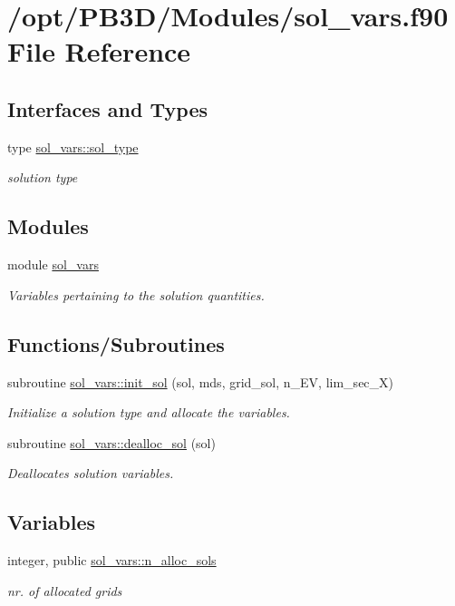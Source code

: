 \hypertarget{sol__vars_8f90}{}\section{/opt/\+P\+B3\+D/\+Modules/sol\+\_\+vars.f90 File Reference}
\label{sol__vars_8f90}
\subsection*{Interfaces and Types}
\begin{DoxyCompactItemize}
\item 
type \hyperlink{structsol__vars_1_1sol__type}{sol\+\_\+vars\+::sol\+\_\+type}
\begin{DoxyCompactList}\small\item\em solution type \end{DoxyCompactList}\end{DoxyCompactItemize}
\subsection*{Modules}
\begin{DoxyCompactItemize}
\item 
module \hyperlink{namespacesol__vars}{sol\+\_\+vars}
\begin{DoxyCompactList}\small\item\em Variables pertaining to the solution quantities. \end{DoxyCompactList}\end{DoxyCompactItemize}
\subsection*{Functions/\+Subroutines}
\begin{DoxyCompactItemize}
\item 
subroutine \hyperlink{namespacesol__vars_a05d1378774a44f53c9643bdacc5bee4a}{sol\+\_\+vars\+::init\+\_\+sol} (sol, mds, grid\+\_\+sol, n\+\_\+\+EV, lim\+\_\+sec\+\_\+X)
\begin{DoxyCompactList}\small\item\em Initialize a solution type and allocate the variables. \end{DoxyCompactList}\item 
subroutine \hyperlink{namespacesol__vars_a9ae65a5252aede548e5238e50c1bb2ba}{sol\+\_\+vars\+::dealloc\+\_\+sol} (sol)
\begin{DoxyCompactList}\small\item\em Deallocates solution variables. \end{DoxyCompactList}\end{DoxyCompactItemize}
\subsection*{Variables}
\begin{DoxyCompactItemize}
\item 
integer, public \hyperlink{namespacesol__vars_a91634d69ba45b896816f40e9013ddc79}{sol\+\_\+vars\+::n\+\_\+alloc\+\_\+sols}
\begin{DoxyCompactList}\small\item\em nr. of allocated grids \end{DoxyCompactList}\end{DoxyCompactItemize}
